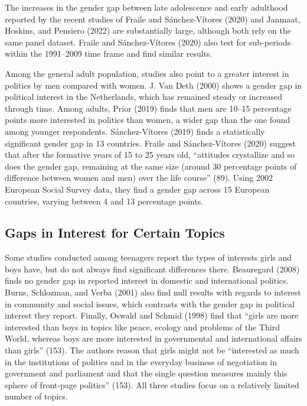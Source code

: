 \documentclass[
  letterpaper,
  DIV=11,
  numbers=noendperiod]{scrreprt}
\begin{document}
The increases in the gender gap between late adolescence and early
adulthood reported by the recent studies of Fraile and Sánchez-Vítores
(2020) and Janmaat, Hoskins, and Pensiero (2022) are substantially
large, although both rely on the same panel dataset. Fraile and
Sánchez-Vítores (2020) also test for sub-periods within the 1991--2009
time frame and find similar results.

Among the general adult population, studies also point to a greater
interest in politics by men compared with women. J. Van Deth (2000)
shows a gender gap in political interest in the Netherlands, which has
remained steady or increased through time. Among adults, Prior (2019)
finds that men are 10--15 percentage points more interested in politics
than women, a wider gap than the one found among younger respondents.
Sánchez-Vítores (2019) finds a statistically significant gender gap in
13 countries. Fraile and Sánchez-Vítores (2020) suggest that after the
formative years of 15 to 25 years old, ``attitudes crystallize and so
does the gender gap, remaining at the same size (around 30 percentage
points of difference between women and men) over the life course'' (89).
Using 2002 European Social Survey data, they find a gender gap across 15
European countries, varying between 4 and 13 percentage points.

\hypertarget{gaps-in-interest-for-certain-topics}{%
\subsection{Gaps in Interest for Certain
Topics}\label{gaps-in-interest-for-certain-topics}}

Some studies conducted among teenagers report the types of interests
girls and boys have, but do not always find significant differences
there. Beauregard (2008) finds no gender gap in reported interest in
domestic and international politics. Burns, Schlozman, and Verba (2001)
also find null results with regards to interest in community and social
issues, which contrasts with the gender gap in political interest they
report. Finally, Oswald and Schmid (1998) find that ``girls are more
interested than boys in topics like peace, ecology and problems of the
Third World, whereas boys are more interested in governmental and
international affairs than girls'' (153). The authors reason that girls
might not be ``interested as much in the institutions of politics and in
the everyday business of negotiation in government and parliament and
that the single question measures mainly this sphere of front-page
politics'' (153). All three studies focus on a relatively limited number
of topics.
\end{document}
